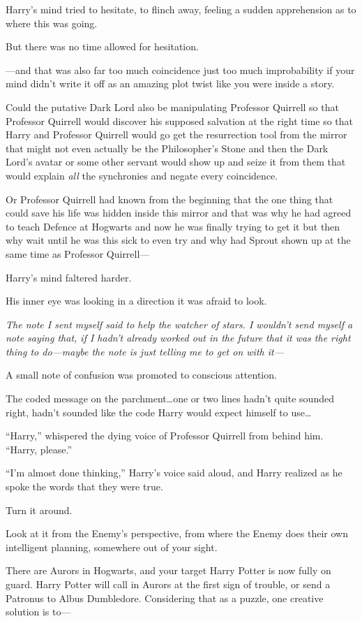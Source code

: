 Harry’s mind tried to hesitate, to flinch away, feeling a sudden apprehension as to where this was going.

But there was no time allowed for hesitation.

—and that was also far too much coincidence just too much improbability if your mind didn’t write it off as an amazing plot twist like you were inside a story.

Could the putative Dark Lord also be manipulating Professor Quirrell so that Professor Quirrell would discover his supposed salvation at the right time so that Harry and Professor Quirrell would go get the resurrection tool from the mirror that might not even actually be the Philosopher’s Stone and then the Dark Lord’s avatar or some other servant would show up and seize it from them that would explain \emph{all} the synchronies and negate every coincidence.

Or Professor Quirrell had known from the beginning that the one thing that could save his life was hidden inside this mirror and that was why he had agreed to teach Defence at Hogwarts and now he was finally trying to get it but then why wait until he was this sick to even try and why had Sprout shown up at the same time as Professor Quirrell—

Harry’s mind faltered harder.

His inner eye was looking in a direction it was afraid to look.

\emph{The note I sent myself said to help the watcher of stars. I wouldn’t send myself a note saying that, if I hadn’t already worked out in the future that it was the right thing to do—maybe the note is just telling me to get on with it—}

A small note of confusion was promoted to conscious attention.

The coded message on the parchment…one or two lines hadn’t quite sounded right, hadn’t sounded like the code Harry would expect himself to use…

“Harry,” whispered the dying voice of Professor Quirrell from behind him. “Harry, please.”

“I’m almost done thinking,” Harry’s voice said aloud, and Harry realized as he spoke the words that they were true.

Turn it around.

Look at it from the Enemy’s perspective, from where the Enemy does their own intelligent planning, somewhere out of your sight.

There are Aurors in Hogwarts, and your target Harry Potter is now fully on guard. Harry Potter will call in Aurors at the first sign of trouble, or send a Patronus to Albus Dumbledore. Considering that as a puzzle, one creative solution is to—

